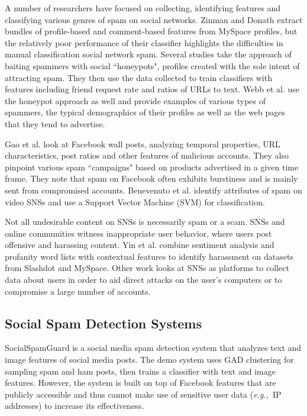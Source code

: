 \documentclass[preprint]{acm_proc_article-sp}
\newcommand{\eg}{{\em e.g.,}~}
\begin{document}
A number of researchers have focused on collecting, identifying features 
and classifying various genres of spam on social networks. Zinman and 
Donath \cite{zinman} extract bundles of profile-based and comment-based 
features from MySpace profiles, but the relatively poor performance of their classifier highlights 
the difficulties in manual classification social network spam. Several 
studies take the approach of baiting spammers with social ``honeypots", profiles 
created with the sole intent of attracting spam.\cite{stringhini, lee} They 
then use the data collected to train classifiers with features including 
friend request rate and ratios of URLs to text. Webb et al. \cite{webb} use 
the honeypot approach as well and provide examples of various types of spammers, 
the typical demographics of their profiles as well as the web pages that they tend to advertise. 

Gao et al. \cite{gao} look at Facebook wall posts, analyzing temporal properties, 
URL characteristics, post ratios and other features of malicious accounts. They 
also pinpoint various spam ``campaigns" based on products advertised in a given 
time frame. They note that spam on Facebook often exhibits burstiness and is mainly 
sent from compromised accounts. Benevenuto et al. \cite{benevenuto} identify 
attributes of spam on video SNSs and use a Support Vector Machine (SVM) for classification.

Not all undesirable content on SNSs is necessarily spam or a scam. SNSs and 
online communities witness inappropriate user behavior, where users post offensive 
and harassing content. Yin et al. \cite{yin} combine sentiment analysis and profanity 
word lists with contextual features to identify harassment on datasets from Slashdot 
and MySpace. Other work looks at SNSs as platforms to collect data about users in 
order to aid direct attacks on the user's computers or to compromise a large number of accounts. \cite{patsakis, huber}

\subsection{Social Spam Detection Systems}

SocialSpamGuard \cite{jin} is a social media spam detection system that analyzes 
text and image features of social media posts. The demo system uses GAD 
clustering \cite{jingad} for sampling spam and ham posts, then trains a 
classifier with text and image features. However, the system is built on top 
of Facebook features that are publicly accessible and thus cannot make use of 
sensitive user data (\eg IP addresses) to increase its effectiveness. 
\end{document}
